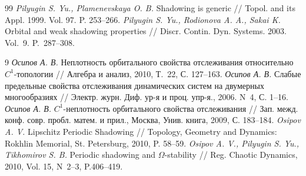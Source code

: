 \documentclass[12pt]{article}
\begin{document}
{\begin{thebibliography}{99}
 \textit{Pilyugin S. Yu., Plamenevskaya O. B.} Shadowing is generic // Topol. and its Appl. 1999. Vol. 97. P. 253--266.
 \textit{Pilyugin S. Yu., Rodionova A. A., Sakai K.} Orbital and weak shadowing properties // Discr. Contin. Dyn. Systems. 2003. Vol.~9. P.~287--308.
\end{thebibliography}

\renewcommand{\refname}{Публикации автора по теме диссертации}

\begin{thebibliography}{9}
\textit{Осипов А. В.} Неплотность орбитального свойства отслеживания относительно $C^1$-топологии // Алгебра и анализ, 2010, Т.~22, С. 127--163.
\textit{Осипов А. В.} Слабые предельные свойства отслеживания динами\-ческих систем на двумерных многообразиях // Электр. журн. Диф. ур-я и проц. упр-я., 2006. N\ 4, С. 1--16.  
\textit{Осипов А. В.} $C^1$-неплотность орбитального свойства отслеживания // Зап. межд. конф. совр. пробл. матем. и прил., Москва, Унив. книга, 2009, С. 183--184.
\textit{Osipov A. V.} Lipschitz Periodic Shadowing // Topology, Geometry and Dynamics: Rokhlin Memorial, St. Petersburg, 2010, P. 58--59.
\textit{Osipov A. V., Pilyugin S. Yu., Tikhomirov S. B.} Periodic shadowing and $\Omega$-stability // Reg. Chaotic Dynamics, 2010, Vol. 15, N\ 2--3, P.406--419.
\end{thebibliography}

\newpage

\makeatletter
\renewcommand{\@oddhead}{\hfill{\large }\hfill}
\renewcommand{\@oddfoot}{}
\renewcommand{\@evenhead}{\hfill{\large }\hfill}
\renewcommand{\@evenfoot}{}
\makeatother

\clearpage \vspace*{\fill}

}
\end{document}
